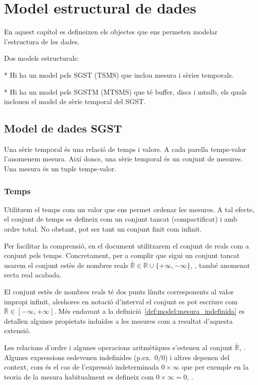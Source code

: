 
\chapter{Model estructural de dades}

En aquest capítol es defineixen els objectes que ens permeten modelar l'estructura de les dades.

Dos models estructurals:

* Hi ha un model pels SGST (TSMS) que inclou mesura i sèries temporals.

* Hi ha un model pels SGSTM (MTSMS) que té buffer, discs i mtsdb, els quals inclouen el model de sèrie temporal del SGST.


\section{Model de dades SGST}

Una sèrie temporal és una relació de temps i valors. A cada parella temps-valor l'anomenem mesura. Així doncs, una sèrie temporal és un conjunt de mesures. Una mesura és un tuple temps-valor.





\subsection{Temps}

Utilitzem el temps com un valor que ens permet ordenar les mesures.  
A tal efecte, el conjunt de temps es defineix com un conjunt tancat (compactificat) i amb ordre total. No obstant, pot ser tant un conjunt finit com infinit. 

Per facilitar la comprensió, en el document utilitzarem el conjunt de reals com a conjunt pels temps. Concretament, per a complir que sigui un conjunt tancat usarem el conjunt estès de nombres reals $\bar{\mathbb{R}} \in \mathbb{R} \cup \{+\infty,-\infty\}$, \parencite{wiki:extendedreal,cantrell:extendedreal}, també anomenat recta real acabada. 


El conjunt estès de nombres reals té dos punts límits corresponents al valor impropi infinit, aleshores en notació d'interval el conjunt es pot escriure com $\bar{\mathbb{R}} \in [-\infty,+\infty]$.  Més endavant a la definició~\ref{def:model:mesura_indefinida} es detallen algunes propietats induïdes a les mesures com a resultat d'aquesta extensió.

Les relacions d'ordre i algunes operacions aritmètiques s'estenen al
conjunt $\bar{\mathbb{R}}$, \cite{cantrell:extendedreal}.  Algunes
expressions esdevenen indefinides (p.ex.\ $0/0$) i altres depenen del
context, com és el cas de l'expressió indeterminada $0 \times \infty$ que
per exemple en la teoria de la mesura habitualment es defineix com $0 \times
\infty = 0$, \cite{wiki:extendedreal}.


